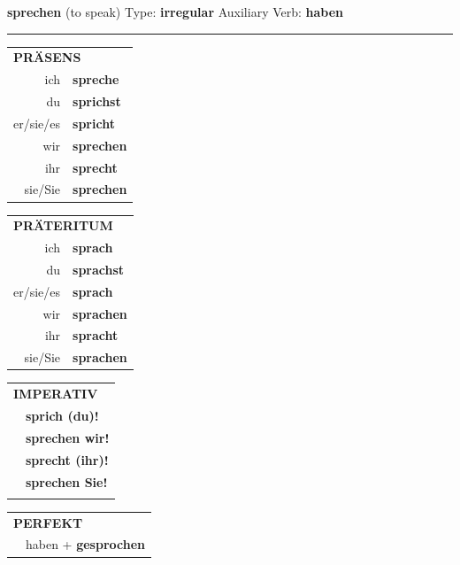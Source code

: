 \documentclass[10pt,a4paper]{revtex4-2}
\begin{document}
\begin{verbbox}
    {\Large \bf sprechen} (to speak) \hfill Type: \textbf{irregular} \hfill Auxiliary Verb: \textbf{haben} 
    
     \vspace{5pt}

    \hrule
    
    \vspace{5pt}

  \begin{tabular}{rl}
     \multicolumn{2}{l}{\textbf{PRÄSENS} }\\
    ich & \textbf{spreche}\\
    du & \textbf{sprichst}\\
    er/sie/es & \textbf{spricht}\\
    wir & \textbf{sprechen}\\
    ihr & \textbf{sprecht}\\
    sie/Sie & \textbf{sprechen}\\
  \end{tabular}
  \hfill
     \begin{tabular}{rl}
    \multicolumn{2}{l}{\textbf{PRÄTERITUM} }\\
    ich & \textbf{sprach}\\
    du & \textbf{sprachst}\\
    er/sie/es & \textbf{sprach}\\
    wir & \textbf{sprachen}\\
    ihr & \textbf{spracht}\\
    sie/Sie & \textbf{sprachen}\\
  \end{tabular}
  \hfill
  \begin{tabular}{rl}
     \multicolumn{2}{l}{\textbf{IMPERATIV} }\\
   & \textbf{sprich (du)!}\\
   & \textbf{sprechen wir!}\\
   & \textbf{sprecht (ihr)!}\\
   & \textbf{sprechen Sie!}\\
   & \vspace{10pt}
  \end{tabular}

    \vspace{10pt}

 \begin{tabular}{rl}
     \multicolumn{2}{l}{\textbf{PERFEKT}}\\
  &  haben + \textbf{gesprochen}\\
  \end{tabular}
\hfill
   \begin{tabular}{rl}
   

\end{tabular}
\end{verbbox}
\end{document}
